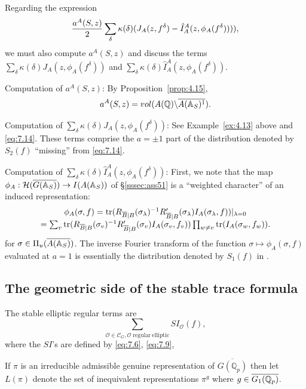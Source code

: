 Regarding the expression
\[
{a^A(S,z)\over 2}
\sum_\delta \kappa(\delta)
(J_A(z,f^\delta)-\hat{I}_A^A(z,\phi_A(f^\delta)))),
\]
we must also compute $a^A(S,z)$ and discuss the terms
$\sum_\delta \kappa(\delta)J_A(z,\phi_A(f^\delta))$ and
$\sum_\delta \kappa(\delta)\hat{I}_A^A(z,\phi_A(f^\delta))$.

Computation of $a^A(S,z)$: By Proposition~\ref{prop:4.15},
\[
a^A(S,z)=vol(A(\mathbb{Q} )\backslash \overline{A(\mathbb{A} _S)^1}).
\]

Computation of
$\sum_\delta \kappa(\delta)J_A(z,\phi_A(f^\delta))$:
See Example~\ref{ex:4.13} above and \eqref{eq:7.14}. These terms
comprise the $a=\pm 1$ part of the distribution denoted by
$S_2(f)$ ``missing'' from \eqref{eq:7.14}.

Computation of $\sum_\delta \kappa(\delta)\hat{I}_A^A(z,\phi_A(f^\delta))$:
First, we note that the map
$\phi_A:{\mathcal{H}}(\overline{G(\mathbb{A} _S)}) \rightarrow I(A(\mathbb{A} _S))$
of \S\ref{sssec:ass51} is a ``weighted
character'' of an induced representation:
\begin{equation}\label{eq:7.18}
\begin{array}{c}
\phi_A(\sigma,f)=
{\rm tr}(R_{\overline{B}|B}(\sigma_\lambda)^{-1}
R'_{\overline{B}|B}(\sigma_\lambda)I_A(\sigma_\lambda,f))|_{\lambda =0}\\
=\sum_v
{\rm tr}(R_{\overline{B}|B}(\sigma_v)^{-1}
R'_{\overline{B}|B}(\sigma_v)I_A(\sigma_v,f_v))
\prod_{w\not= v}{\rm tr}(I_A(\sigma_w,f_w)).
\end{array}
\end{equation}
for $\sigma\in \Pi_u(\overline{A(\mathbb{A} _S)})$.
The inverse Fourier transform of the function
$\sigma\longmapsto \phi_A(\sigma, f)$ evaluated at $a=1$ is
essentially the distribution denoted by $S_1(f)$ in \cite{LL}.

\subsection{The geometric side of the stable trace formula}

The stable elliptic regular terms are 
\begin{equation}\label{eq:7.19}
\sum_{ {\mathcal{O}}\in {\mathcal{C}}_G ,
\mathcal{O}\;\mathrm{regular\ elliptic} }
SI_{\mathcal{O}}(f),
\end{equation}
where the $SI$'s are defined by \eqref{eq:7.6}, \eqref{eq:7.9}, 

\begin{definition}\label{defn:7.18} If $\pi$ is an irreducible admissible
genuine representation of
$\overline{G({\mathbb Q}_p)}$ then let
$L(\pi)$ denote the set of inequivalent representations
$\pi^g$ where $g\in \overline{G_1(\mathbb{Q} _p)}$.
\end{definition}

